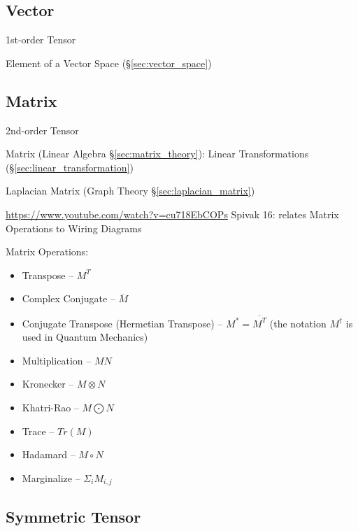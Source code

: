 \subsection{Vector}\label{sec:vector}

1st-order Tensor

Element of a Vector Space (\S\ref{sec:vector_space})



\subsection{Matrix}\label{sec:matrix}

2nd-order Tensor

Matrix (Linear Algebra \S\ref{sec:matrix_theory}):
Linear Transformations (\S\ref{sec:linear_transformation})

Laplacian Matrix (Graph Theory \S\ref{sec:laplacian_matrix})

\url{https://www.youtube.com/watch?v=cu718EbCOPs} Spivak 16: relates
Matrix Operations to Wiring Diagrams %

Matrix Operations:
\begin{itemize}
\item Transpose -- $M^T$
\item Complex Conjugate -- $\overline{M}$
\item Conjugate Transpose (Hermetian Transpose) -- $M^* = \overline{M^T}$
  (the notation $M^\dag$ is used in Quantum Mechanics)
\item Multiplication -- $MN$
\item Kronecker -- $M \otimes N$
\item Khatri-Rao -- $M \bigodot N$
\item Trace -- $Tr(M)$
\item Hadamard -- $M \circ N$
\item Marginalize -- $\Sigma_i M_{i,j}$
\end{itemize}



\subsection{Symmetric Tensor}\label{sec:symmetric_tensor}

